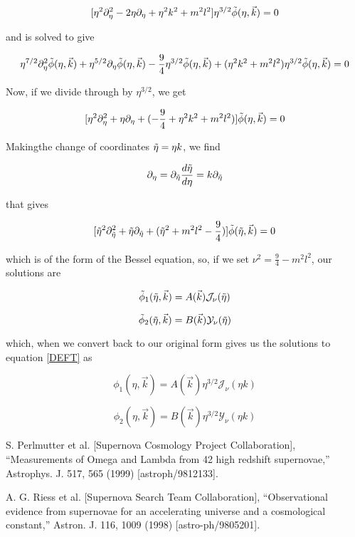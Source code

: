 \documentclass[a4paper,11pt]{article}
\numberwithin{equation}{section}
\numberwithin{figure}{section}
\begin{document}
\begin{large}
$$[\eta^2\partial_\eta^2-2\eta\partial_\eta+\eta^2k^2+m^2l^2]\eta^{3/2}\Tilde{\phi}(\eta,\Vec{k})=0$$

and is solved to give

$$\eta^{7/2}\partial_\eta^2\Tilde{\phi}(\eta,\Vec{k})+\eta^{5/2}\partial_\eta\Tilde{\phi}(\eta,\Vec{k})-\frac{9}{4}\eta^{3/2}\Tilde{\phi}(\eta,\Vec{k})+(\eta^2k^2+m^2l^2)\eta^{3/2}\Tilde{\phi}(\eta,\Vec{k})=0$$

Now, if we divide through by $\eta^{3/2}$, we get

$$[\eta^2\partial_\eta^2+\eta\partial_\eta+(-\frac{9}{4}+\eta^2k^2+m^2l^2)]\Tilde{\phi}(\eta,\Vec{k})=0$$

Makingthe change of coordinates $\Tilde{\eta}=\eta k$, we find 

$$\partial_\eta=\partial_{\Tilde{\eta}}\frac{d\Tilde{\eta}}{d\eta}=k\partial_{\Tilde{\eta}}$$

that gives

$$[{\Tilde{\eta}}^2\partial_{\Tilde{\eta}}^2+{\Tilde{\eta}}\partial_{\Tilde{\eta}}+(\Tilde{\eta}^2+m^2l^2-\frac{9}{4})]\Tilde{\phi}(\Tilde{\eta},\Vec{k})=0$$

which is of the form of the Bessel equation, so, if we set $\nu^2=\frac{9}{4}-m^2l^2$, our solutions are

$$\Tilde{\phi}_1(\Tilde{\eta},\Vec{k})=A(\Vec{k})\mathcal{J}_\nu (\Tilde{\eta})$$

$$\Tilde{\phi}_2(\Tilde{\eta},\Vec{k})=B(\Vec{k})\mathcal{Y}_\nu (\Tilde{\eta})$$

which, when we convert back to our original form gives us the solutions to equation \eqref{DEFT} as

$$\phi_1(\eta,\Vec{k})=A(\Vec{k})\eta^{3/2}\mathcal{J}_\nu (\eta k)$$

$$\phi_2(\eta,\Vec{k})=B(\Vec{k})\eta^{3/2}\mathcal{Y}_\nu (\eta k)$$



\newpage

\begin{thebibliography}{}

    S. Perlmutter et al. [Supernova Cosmology Project Collaboration], “Measurements of Omega
    and Lambda from 42 high redshift supernovae,” Astrophys. J. 517, 565 (1999) [astroph/9812133].


    A. G. Riess et al. [Supernova Search Team Collaboration], “Observational evidence from supernovae for an accelerating universe and a cosmological constant,” Astron. J. 116, 1009 (1998)
    [astro-ph/9805201].


\end{thebibliography}
\end{large}
\end{document}
